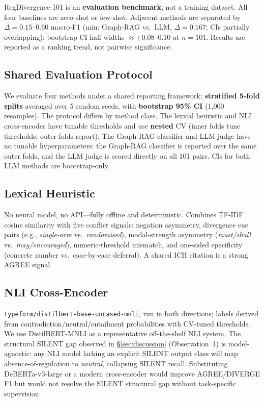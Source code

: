 \documentclass[manuscript]{acmart}
\begin{document}
RegDivergence-101 is an \textbf{evaluation benchmark}, not a training dataset.
All four baselines are zero-shot or few-shot. Adjacent methods are separated by
$\Delta = 0.15$--$0.60$ macro-F1 (min: Graph-RAG vs.\ LLM, $\Delta = 0.167$;
CIs partially overlapping); bootstrap CI half-widths $\approx \pm 0.08$--$0.10$
at $n = 101$. Results are reported as a ranking trend, not pairwise significance.

\subsection{Shared Evaluation Protocol}

We evaluate four methods under a shared reporting framework:
\textbf{stratified 5-fold splits} averaged over 5 random seeds, with
\textbf{bootstrap 95\% CI} (1{,}000 resamples). The protocol differs by
method class. The lexical heuristic and NLI cross-encoder have tunable
thresholds and use \textbf{nested} CV (inner folds tune thresholds, outer folds
report). The Graph-RAG classifier and LLM judge have no tunable
hyperparameters: the Graph-RAG classifier is reported over the same outer
folds, and the LLM judge is scored directly on all 101 pairs. CIs for both LLM
methods are bootstrap-only.

\subsection{Lexical Heuristic}

No neural model, no API---fully offline and deterministic. Combines TF-IDF
cosine similarity with five conflict signals: negation asymmetry, divergence
cue pairs (e.g., \textit{single-arm} vs.\ \textit{randomised}), modal-strength
asymmetry (\textit{must/shall} vs.\ \textit{may/encouraged}),
numeric-threshold mismatch, and one-sided specificity (concrete number
vs.\ case-by-case deferral). A shared ICH citation is a strong AGREE signal.

\subsection{NLI Cross-Encoder}

\texttt{typeform/distilbert-base-uncased-mnli}, run in both directions; labels
derived from contradiction/neutral/entailment probabilities with CV-tuned
thresholds. We use DistilBERT-MNLI as a representative off-the-shelf NLI
system. The structural SILENT gap observed in \S\ref{sec:discussion} (Observation~1)
is model-agnostic: any NLI model lacking an explicit SILENT output class will
map absence-of-regulation to \textit{neutral}, collapsing SILENT recall.
Substituting DeBERTa-v3-large or a modern cross-encoder would improve
AGREE/DIVERGE F1 but would not resolve the SILENT structural gap without
task-specific supervision.
\end{document}
